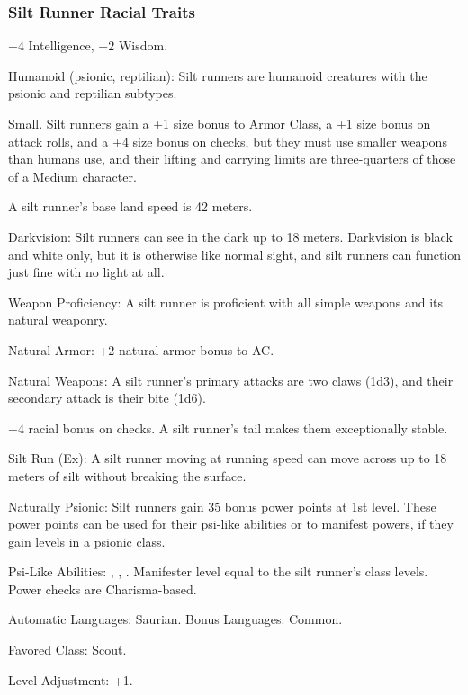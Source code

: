 \subsubsection{Silt Runner Racial Traits}
\begin{itemize*}
    \item $-4$ Intelligence, $-2$ Wisdom.
    \item Humanoid (psionic, reptilian): Silt runners are humanoid creatures with the psionic and reptilian subtypes.
    \item Small. Silt runners gain a +1 size bonus to Armor Class, a +1 size bonus on attack rolls, and a +4 size bonus on  checks, but they must use smaller weapons than humans use, and their lifting and carrying limits are three-quarters of those of a Medium character.
    \item A silt runner's base land speed is 42 meters.

    \item Darkvision: Silt runners can see in the dark up to 18 meters. Darkvision is black and white only, but it is otherwise like normal sight, and silt runners can function just fine with no light at all.

    \item Weapon Proficiency: A silt runner is proficient with all simple weapons and its natural weaponry.
    \item Natural Armor: +2 natural armor bonus to AC.
    \item Natural Weapons: A silt runner's primary attacks are two claws (1d3), and their secondary attack is their bite (1d6).

    \item +4 racial bonus on  checks. A silt runner's tail makes them exceptionally stable.

    \item Silt Run (Ex): A silt runner moving at running speed can move across up to 18 meters of silt without breaking the surface.
    \item Naturally Psionic: Silt runners gain 35 bonus power points at 1st level. These power points can be used for their psi-like abilities or to manifest powers, if they gain levels in a psionic class. %
    \item Psi-Like Abilities: 
        ,
        ,
        .
    Manifester level equal to the silt runner's class levels. Power checks are Charisma-based.

    \item Automatic Languages: Saurian. Bonus Languages: Common.
    \item Favored Class: Scout.
    \item Level Adjustment: +1.
\end{itemize*}
